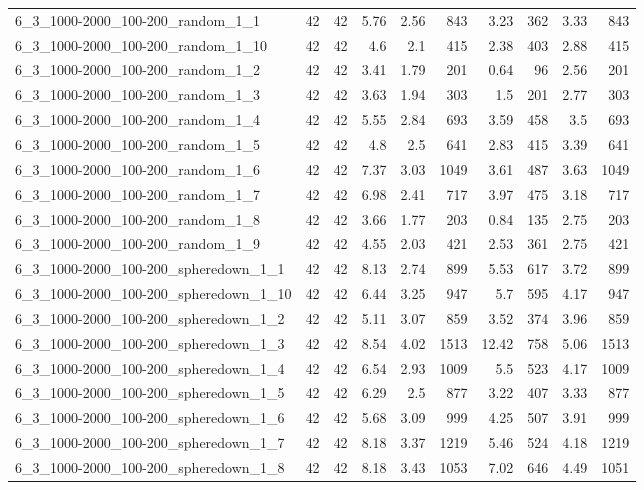 \begin{center}
\begin{scriptsize}
\begin{longtable}{lrrrrrrrrr}
6\_3\_1000-2000\_100-200\_random\_1\_1 & 42 & 42 & 5.76 & 2.56 & 843 & 3.23 & 362 & 3.33 & 843\\
6\_3\_1000-2000\_100-200\_random\_1\_10 & 42 & 42 & 4.6 & 2.1 & 415 & 2.38 & 403 & 2.88 & 415\\
6\_3\_1000-2000\_100-200\_random\_1\_2 & 42 & 42 & 3.41 & 1.79 & 201 & 0.64 & 96 & 2.56 & 201\\
6\_3\_1000-2000\_100-200\_random\_1\_3 & 42 & 42 & 3.63 & 1.94 & 303 & 1.5 & 201 & 2.77 & 303\\
6\_3\_1000-2000\_100-200\_random\_1\_4 & 42 & 42 & 5.55 & 2.84 & 693 & 3.59 & 458 & 3.5 & 693\\
6\_3\_1000-2000\_100-200\_random\_1\_5 & 42 & 42 & 4.8 & 2.5 & 641 & 2.83 & 415 & 3.39 & 641\\
6\_3\_1000-2000\_100-200\_random\_1\_6 & 42 & 42 & 7.37 & 3.03 & 1049 & 3.61 & 487 & 3.63 & 1049\\
6\_3\_1000-2000\_100-200\_random\_1\_7 & 42 & 42 & 6.98 & 2.41 & 717 & 3.97 & 475 & 3.18 & 717\\
6\_3\_1000-2000\_100-200\_random\_1\_8 & 42 & 42 & 3.66 & 1.77 & 203 & 0.84 & 135 & 2.75 & 203\\
6\_3\_1000-2000\_100-200\_random\_1\_9 & 42 & 42 & 4.55 & 2.03 & 421 & 2.53 & 361 & 2.75 & 421\\
6\_3\_1000-2000\_100-200\_spheredown\_1\_1 & 42 & 42 & 8.13 & 2.74 & 899 & 5.53 & 617 & 3.72 & 899\\
6\_3\_1000-2000\_100-200\_spheredown\_1\_10 & 42 & 42 & 6.44 & 3.25 & 947 & 5.7 & 595 & 4.17 & 947\\
6\_3\_1000-2000\_100-200\_spheredown\_1\_2 & 42 & 42 & 5.11 & 3.07 & 859 & 3.52 & 374 & 3.96 & 859\\
6\_3\_1000-2000\_100-200\_spheredown\_1\_3 & 42 & 42 & 8.54 & 4.02 & 1513 & 12.42 & 758 & 5.06 & 1513\\
6\_3\_1000-2000\_100-200\_spheredown\_1\_4 & 42 & 42 & 6.54 & 2.93 & 1009 & 5.5 & 523 & 4.17 & 1009\\
6\_3\_1000-2000\_100-200\_spheredown\_1\_5 & 42 & 42 & 6.29 & 2.5 & 877 & 3.22 & 407 & 3.33 & 877\\
6\_3\_1000-2000\_100-200\_spheredown\_1\_6 & 42 & 42 & 5.68 & 3.09 & 999 & 4.25 & 507 & 3.91 & 999\\
6\_3\_1000-2000\_100-200\_spheredown\_1\_7 & 42 & 42 & 8.18 & 3.37 & 1219 & 5.46 & 524 & 4.18 & 1219\\
6\_3\_1000-2000\_100-200\_spheredown\_1\_8 & 42 & 42 & 8.18 & 3.43 & 1053 & 7.02 & 646 & 4.49 & 1051\\

\end{longtable}
\end{scriptsize}
\end{center}
